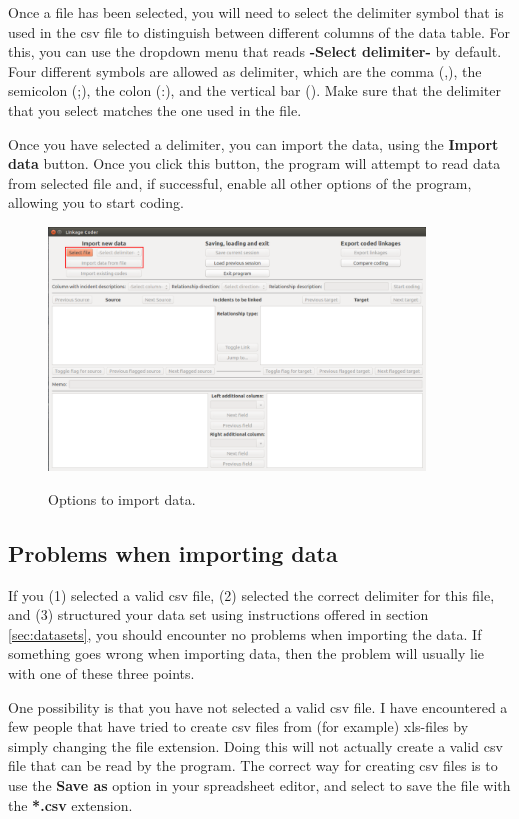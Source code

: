 \documentclass{memoir}
\begin{document}
Once a file has been selected, you will need to select the delimiter symbol that is used in the csv file to distinguish between different columns of the data table. For this, you can use the dropdown menu that reads \textbf{-Select delimiter-} by default. Four different symbols are allowed as delimiter, which are the comma (,), the semicolon (;), the colon (:), and the vertical bar (\textbar). Make sure that the delimiter that you select matches the one used in the file.

Once you have selected a delimiter, you can import the data, using the \textbf{Import data} button. Once you click this button, the program will attempt to read data from selected file and, if successful, enable all other options of the program, allowing you to start coding.   

\begin{figure}[h!]
  \centering
  \caption{Options to import data.}
  \includegraphics[width=100mm]{Screenshot_0.pdf}
  \label{fig:importoptions}
\end{figure}

\subsection{Problems when importing data}
\label{sec:importerrors}

If you (1) selected a valid csv file, (2) selected the correct delimiter for this file, and (3) structured your data set using instructions offered in section \ref{sec:datasets}, you should encounter no problems when importing the data. If something goes wrong when importing data, then the problem will usually lie with one of these three points.

One possibility is that you have not selected a valid csv file. I have encountered a few people that have tried to create csv files from (for example) xls-files by simply changing the file extension. Doing this will not actually create a valid csv file that can be read by the program. The correct way for creating csv files is to use the \textbf{Save as} option in your spreadsheet editor, and select to save the file with the \textbf{*.csv} extension.
\end{document}
